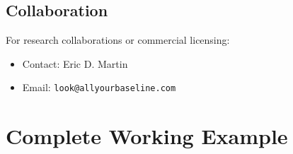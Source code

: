 \documentclass[11pt]{article}
\begin{document}
\subsection{Collaboration}

For research collaborations or commercial licensing:

\begin{itemize}
    \item Contact: Eric D. Martin
    \item Email: \texttt{look@allyourbaseline.com}
\end{itemize}

\appendix

\section{Complete Working Example}
\end{document}

